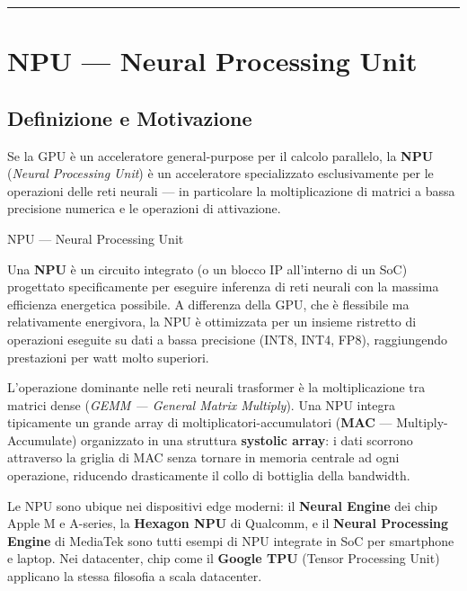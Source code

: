 \documentclass[
  italian,
  openany]{book}
\begin{document}
\begin{center}\rule{0.5\linewidth}{0.5pt}\end{center}

\section{NPU --- Neural Processing
Unit}\label{npu-neural-processing-unit}

\subsection{Definizione e Motivazione}\label{definizione-e-motivazione}

Se la GPU è un acceleratore general-purpose per il calcolo parallelo, la
\textbf{NPU} (\emph{Neural Processing Unit}) è un acceleratore
specializzato esclusivamente per le operazioni delle reti neurali --- in
particolare la moltiplicazione di matrici a bassa precisione numerica e
le operazioni di attivazione.

\begin{calloutdefinition}{NPU — Neural Processing Unit}

Una \textbf{NPU} è un circuito integrato (o un blocco IP all'interno di
un SoC) progettato specificamente per eseguire inferenza di reti neurali
con la massima efficienza energetica possibile. A differenza della GPU,
che è flessibile ma relativamente energivora, la NPU è ottimizzata per
un insieme ristretto di operazioni eseguite su dati a bassa precisione
(INT8, INT4, FP8), raggiungendo prestazioni per watt molto superiori.

\end{calloutdefinition}

L'operazione dominante nelle reti neurali trasformer è la
moltiplicazione tra matrici dense (\emph{GEMM --- General Matrix
Multiply}). Una NPU integra tipicamente un grande array di
moltiplicatori-accumulatori (\textbf{MAC} --- Multiply-Accumulate)
organizzato in una struttura \textbf{systolic array}: i dati scorrono
attraverso la griglia di MAC senza tornare in memoria centrale ad ogni
operazione, riducendo drasticamente il collo di bottiglia della
bandwidth.

Le NPU sono ubique nei dispositivi edge moderni: il \textbf{Neural
Engine} dei chip Apple M e A-series, la \textbf{Hexagon NPU} di
Qualcomm, e il \textbf{Neural Processing Engine} di MediaTek sono tutti
esempi di NPU integrate in SoC per smartphone e laptop. Nei datacenter,
chip come il \textbf{Google TPU} (Tensor Processing Unit) applicano la
stessa filosofia a scala datacenter.
\end{document}
